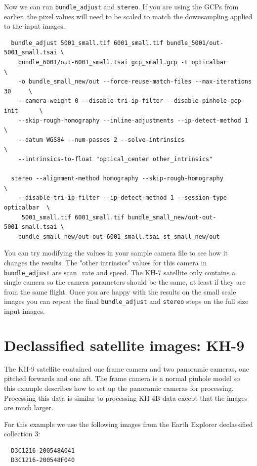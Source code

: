 Now we can run \texttt{bundle\_adjust} and \texttt{stereo}.  If you are using the
GCPs from earlier, the pixel values will need to be scaled to match the downsampling
applied to the input images.

\begin{verbatim}
  bundle_adjust 5001_small.tif 6001_small.tif bundle_5001/out-5001_small.tsai \
    bundle_6001/out-6001_small.tsai gcp_small.gcp -t opticalbar               \
    -o bundle_small_new/out --force-reuse-match-files --max-iterations 30     \
    --camera-weight 0 --disable-tri-ip-filter --disable-pinhole-gcp-init      \
    --skip-rough-homography --inline-adjustments --ip-detect-method 1         \
    --datum WGS84 --num-passes 2 --solve-intrinsics                           \
    --intrinsics-to-float "optical_center other_intrinsics"

  stereo --alignment-method homography --skip-rough-homography              \
    --disable-tri-ip-filter --ip-detect-method 1 --session-type opticalbar  \
     5001_small.tif 6001_small.tif bundle_small_new/out-out-5001_small.tsai \
    bundle_small_new/out-out-6001_small.tsai st_small_new/out
\end{verbatim}

You can try modifying the values in your sample camera file to see how it changes
the results.  The "other intrinsics" values for this camera in \texttt{bundle\_adjust}
are scan\_rate and speed.  The KH-7 satellite only contains a single camera so the
camera parameters should be the same, at least if they are from the same flight.
Once you are happy with the results on the small scale images you can repeat the
final \texttt{bundle\_adjust} and \texttt{stereo} steps on the full size input images.

\section{Declassified satellite images: KH-9}
\label{kh9}

The KH-9 satellite contained one frame camera and two panoramic cameras,
one pitched forwards and one aft.  The frame camera is a normal pinhole model so
this example describes how to set up the panoramic cameras for processing.
Processing this data is similar to processing KH-4B data except that the 
images are much larger.

For this example we use the following images from the Earth Explorer declassified collection 3:
\begin{verbatim}
  D3C1216-200548A041
  D3C1216-200548F040
\end{verbatim}

